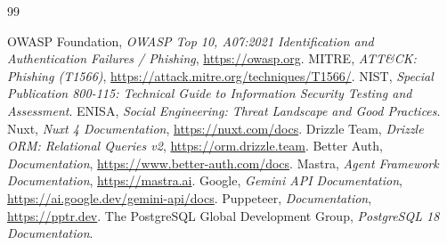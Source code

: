 \documentclass[12pt,a4paper,oneside]{report}
\begin{document}
\begin{thebibliography}{99}
 OWASP Foundation, \emph{OWASP Top 10, A07:2021 Identification and
  Authentication Failures / Phishing}, \url{https://owasp.org}.
 MITRE, \emph{ATT\&CK: Phishing (T1566)}, \url{https://attack.mitre.org/techniques/T1566/}.
 NIST, \emph{Special Publication 800-115: Technical Guide to Information
  Security Testing and Assessment}.
 ENISA, \emph{Social Engineering: Threat Landscape and Good Practices}.
 Nuxt, \emph{Nuxt 4 Documentation}, \url{https://nuxt.com/docs}.
 Drizzle Team, \emph{Drizzle ORM: Relational Queries v2},
  \url{https://orm.drizzle.team}.
 Better Auth, \emph{Documentation}, \url{https://www.better-auth.com/docs}.
 Mastra, \emph{Agent Framework Documentation}, \url{https://mastra.ai}.
 Google, \emph{Gemini API Documentation},
  \url{https://ai.google.dev/gemini-api/docs}.
 Puppeteer, \emph{Documentation}, \url{https://pptr.dev}.
 The PostgreSQL Global Development Group, \emph{PostgreSQL 18 Documentation}.
\end{thebibliography}
\end{document}

